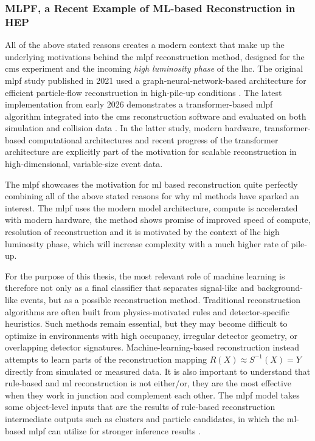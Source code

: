 \subsubsection{MLPF, a Recent Example of ML-based Reconstruction in HEP}

All of the above stated reasons creates a modern context that make up the underlying motivations behind the \gls{mlpf} reconstruction method, designed for the \gls{cms} experiment and the incoming \textit{high luminosity phase} of the \gls{lhc}. The original \gls{mlpf} study published in 2021 used a graph-neural-network-based architecture for efficient particle-flow reconstruction in high-pile-up conditions \cite{pata2021-mlpf}. The latest implementation from early 2026 demonstrates a transformer-based \gls{mlpf} algorithm integrated into the \gls{cms} reconstruction software and evaluated on both simulation and collision data \cite{pata2026-mlpf}. In the latter study, modern hardware, transformer-based computational architectures and recent progress of  the transformer architecture are explicitly part of the motivation for scalable reconstruction in high-dimensional, variable-size event data.

The \gls{mlpf} showcases the motivation for \gls{ml} based reconstruction quite perfectly combining all of the above stated reasons for why \gls{ml} methods have sparked an interest. The \gls{mlpf} uses the modern model architecture, compute is accelerated with modern hardware, the method shows promise of improved speed of compute, resolution of reconstruction and it is motivated by the context of \gls{lhc} high luminosity phase, which will increase complexity with a much higher rate of pile-up.

For the purpose of this thesis, the most relevant role of machine learning is therefore not only as a final classifier that separates signal-like and background-like events, but as a possible reconstruction method. Traditional reconstruction algorithms are often built from physics-motivated rules and detector-specific heuristics. Such methods remain essential, but they may become difficult to optimize in environments with high occupancy, irregular detector geometry, or overlapping detector signatures. Machine-learning-based reconstruction instead attempts to learn parts of the reconstruction mapping $R(X) \approx S^{-1}(X) = Y$ directly from simulated or measured data. It is also important to understand that rule-based and \gls{ml} reconstruction is not either/or, they are the most effective when they work in junction and complement each other. The \gls{mlpf} model takes some object-level inputs that are the results of rule-based reconstruction intermediate outputs such as clusters and particle candidates, in which the \gls{ml}-based \gls{mlpf} can utilize for stronger inference results \cite{pata2021-mlpf}. 

